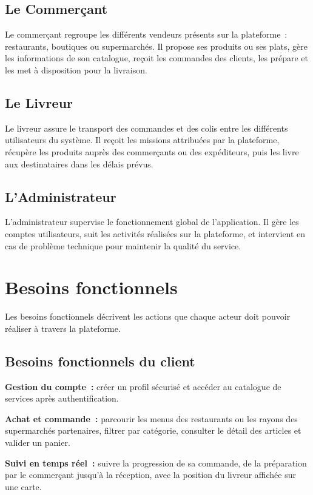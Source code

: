 \documentclass[12pt,fleqn,a4paper]{report}
\begin{document}
\begin{justify}
\subsection{Le Commerçant}
Le commerçant regroupe les différents vendeurs présents sur la plateforme~: restaurants, boutiques ou supermarchés. Il propose ses produits ou ses plats, gère les informations de son catalogue, reçoit les commandes des clients, les prépare et les met à disposition pour la livraison.

\subsection{Le Livreur}
Le livreur assure le transport des commandes et des colis entre les différents utilisateurs du système. Il reçoit les missions attribuées par la plateforme, récupère les produits auprès des commerçants ou des expéditeurs, puis les livre aux destinataires dans les délais prévus.

\subsection{L'Administrateur}
L'administrateur supervise le fonctionnement global de l'application. Il gère les comptes utilisateurs, suit les activités réalisées sur la plateforme, et intervient en cas de problème technique pour maintenir la qualité du service.

\section{Besoins fonctionnels}

Les besoins fonctionnels décrivent les actions que chaque acteur doit pouvoir réaliser à travers la plateforme.

\subsection{Besoins fonctionnels du client}

\textbf{Gestion du compte~:} créer un profil sécurisé et accéder au catalogue de services après authentification.

\vspace{0.3cm}
\textbf{Achat et commande~:} parcourir les menus des restaurants ou les rayons des supermarchés partenaires, filtrer par catégorie, consulter le détail des articles et valider un panier.

\vspace{0.3cm}
\textbf{Suivi en temps réel~:} suivre la progression de sa commande, de la préparation par le commerçant jusqu'à la réception, avec la position du livreur affichée sur une carte.


\end{justify}
\end{document}
